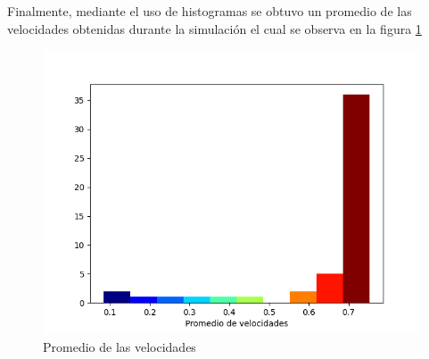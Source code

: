 \documentclass{article}
\begin{document}
Finalmente, mediante el uso de histogramas se obtuvo un promedio de las velocidades obtenidas durante la simulaci\'on el cual se observa en la figura  \ref{f5}

\begin{figure}[H]
       \centering
           \includegraphics[width=0.90\linewidth]{promediovelocidades.png}
           \caption{Promedio de las velocidades}
           \label{f5}
\end{figure}
\end{document}
